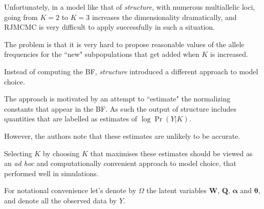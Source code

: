 
\newpage
Unfortunately, in a model like that of {\em structure}, with numerous multiallelic loci, going from $K=2$ to $K=3$ increases the dimensionality dramatically, and RJMCMC is very difficult to apply successfully in such a situation.  

The problem is that it is very hard to propose reasonable values of the allele frequencies for the ``new" subpopulations that get added when $K$ is increased.


Instead of computing the BF, {\sl structure} introduced a different approach to model choice.

The approach is motivated by an attempt to ``estimate" the normalizing constants
that appear in the BF. As such the output of structure includes quantities that are
labelled as estimates of $\log \Pr(Y | K)$.

However, the authors note that these estimates are unlikely to be accurate. 

Selecting
$K$ by choosing $K$ that maximises these estimates should be viewed as an {\it ad hoc}
and computationally convenient approach to model choice, that performed well 
in simulations.


For notational convenience let's denote by $\Omega$ the latent variables $\bm{W}$, $\bm{Q}$, $\bm{\alpha}$ and $\bm{\theta}$, and denote all the observed data by $Y$.

